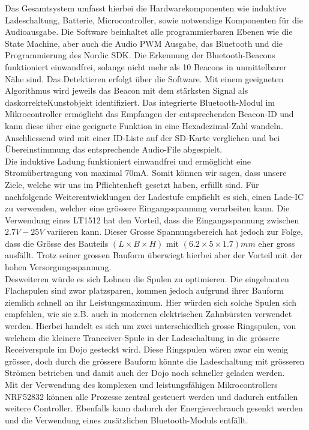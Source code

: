 Das Gesamtsystem umfasst hierbei die Hardwarekomponenten wie induktive Ladeschaltung, Batterie, Microcontroller, sowie notwendige Komponenten für die Audioausgabe. Die Software beinhaltet alle programmierbaren Ebenen wie die State Machine, aber auch die Audio PWM Ausgabe, das Bluetooth und die Programmierung des Nordic SDK.
Die Erkennung der Bluetooth-Beacons funktioniert einwandfrei, solange nicht mehr als 10 Beacons in unmittelbarer Nähe sind. Das Detektieren erfolgt über die Software. Mit einem geeigneten Algorithmus wird jeweils das Beacon mit dem stärksten Signal als das\glqq korrekte\grqq Kunstobjekt identifiziert. Das integrierte Bluetooth-Modul im Mikrocontroller ermöglicht das Empfangen der entsprechenden Beacon-ID und kann diese über eine geeignete Funktion in eine Hexadezimal-Zahl wandeln. Anschliessend wird mit einer ID-Liste auf der SD-Karte verglichen und bei Übereinstimmung das entsprechende Audio-File abgespielt.\\
Die induktive Ladung funktioniert einwandfrei und ermöglicht eine Stromübertragung von maximal 70mA. Somit können wir sagen, dass unsere Ziele, welche wir uns im Pflichtenheft gesetzt haben, erfüllt sind. Für nachfolgende Weiterentwicklungen der Ladestufe empfiehlt es sich, einen Lade-IC zu verwenden, welcher eine grössere Eingangsspannung verarbeiten kann. Die Verwendung eines LT1512 hat den Vorteil, dass die Eingangsspannung zwischen $2.7V - 25V$ variieren kann. Dieser Grosse Spannungsbereich hat jedoch zur Folge, dass die Grösse des Bauteils $(L \times B \times H)$ mit $(6.2\times 5\times 1.7)mm$ eher gross ausfällt. Trotz seiner grossen Bauform überwiegt hierbei aber der Vorteil mit der hohen Versorgungsspannung.\\
Desweiteren würde es sich Lohnen die Spulen zu optimieren. Die eingebauten Flachspulen sind zwar platzsparen, kommen jedoch aufgrund ihrer Bauform ziemlich schnell an ihr Leistungsmaximum. Hier würden sich solche Spulen sich empfehlen, wie sie z.B. auch in modernen elektrischen Zahnbürsten verwendet werden. Hierbei handelt es sich um zwei unterschiedlich grosse Ringspulen, von welchem die kleinere Tranceiver-Spule in der Ladeschaltung in die grössere Receiverspule  im Dojo gesteckt wird. Diese Ringspulen wären zwar ein wenig grösser, doch durch die grössere Bauform könnte die Ladeschaltung mit grösseren Strömen betrieben und damit auch der Dojo noch schneller geladen werden.\\
Mit der Verwendung des komplexen und leistungsfähigen Mikrocontrollers NRF52832 können alle Prozesse zentral gesteuert werden und dadurch entfallen weitere Controller. Ebenfalls kann dadurch der Energieverbrauch gesenkt werden und die Verwendung eines zusätzlichen Bluetooth-Moduls entfällt.
 
